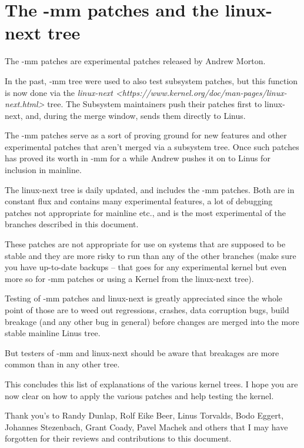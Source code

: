 \documentclass[a4paper,8pt,english]{sphinxmanual}
\begin{document}
\section{The -mm patches and the linux-next tree}
\label{process/applying-patches:the-mm-patches-and-the-linux-next-tree}
The -mm patches are experimental patches released by Andrew Morton.

In the past, -mm tree were used to also test subsystem patches, but this
function is now done via the
\emph{linux-next \textless{}https://www.kernel.org/doc/man-pages/linux-next.html\textgreater{}}
tree. The Subsystem maintainers push their patches first to linux-next,
and, during the merge window, sends them directly to Linus.

The -mm patches serve as a sort of proving ground for new features and other
experimental patches that aren't merged via a subsystem tree.
Once such patches has proved its worth in -mm for a while Andrew pushes
it on to Linus for inclusion in mainline.

The linux-next tree is daily updated, and includes the -mm patches.
Both are in constant flux and contains many experimental features, a
lot of debugging patches not appropriate for mainline etc., and is the most
experimental of the branches described in this document.

These patches are not appropriate for use on systems that are supposed to be
stable and they are more risky to run than any of the other branches (make
sure you have up-to-date backups -- that goes for any experimental kernel but
even more so for -mm patches or using a Kernel from the linux-next tree).

Testing of -mm patches and linux-next is greatly appreciated since the whole
point of those are to weed out regressions, crashes, data corruption bugs,
build breakage (and any other bug in general) before changes are merged into
the more stable mainline Linus tree.

But testers of -mm and linux-next should be aware that breakages are
more common than in any other tree.

This concludes this list of explanations of the various kernel trees.
I hope you are now clear on how to apply the various patches and help testing
the kernel.

Thank you's to Randy Dunlap, Rolf Eike Beer, Linus Torvalds, Bodo Eggert,
Johannes Stezenbach, Grant Coady, Pavel Machek and others that I may have
forgotten for their reviews and contributions to this document.
\end{document}
